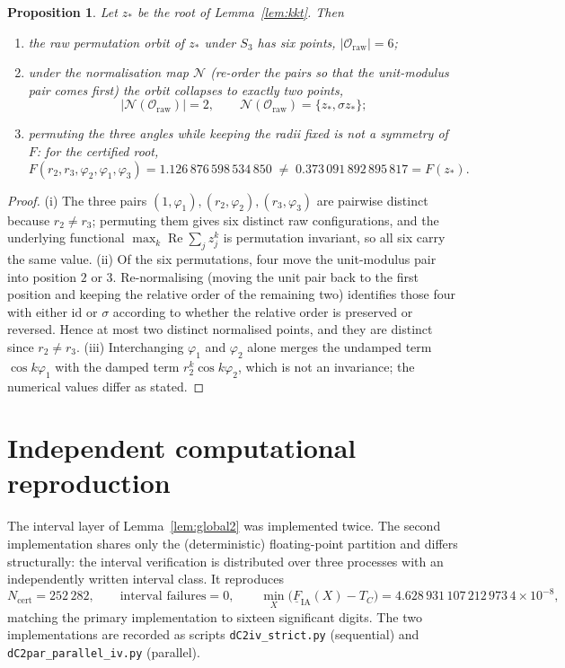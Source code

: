 \documentclass[11pt]{article}
\newtheorem{proposition}[theorem]{Proposition}
\theoremstyle{remark}
\begin{document}
\begin{proposition}\label{prop:orbit}
Let $z_*$ be the root of Lemma~\ref{lem:kkt}. Then
\begin{enumerate}
\item[(i)] the raw permutation orbit of $z_*$ under $S_3$ has six points,
$|\mathcal O_{\mathrm{raw}}|=6$;
\item[(ii)] under the normalisation map $\mathcal N$ (re-order the pairs so that the unit-modulus pair
comes first) the orbit collapses to exactly two points,
\[
\bigl|\mathcal N(\mathcal O_{\mathrm{raw}})\bigr|=2,\qquad
\mathcal N(\mathcal O_{\mathrm{raw}})=\{z_*,\sigma z_*\};
\]
\item[(iii)] permuting the three angles while keeping the radii fixed is \emph{not} a symmetry of $F$: for
the certified root,
\[
F(r_2,r_3,\varphi_2,\varphi_1,\varphi_3)=1.126\,876\,598\,534\,850
\;\ne\;0.373\,091\,892\,895\,817=F(z_*) .
\]
\end{enumerate}
\end{proposition}

\begin{proof}
(i) The three pairs $(1,\varphi_1),(r_2,\varphi_2),(r_3,\varphi_3)$ are pairwise distinct because
$r_2\ne r_3$; permuting them gives six distinct raw configurations, and the underlying functional
$\max_k\operatorname{Re}\sum_jz_j^k$ is permutation invariant, so all six carry the same value.
(ii) Of the six permutations, four move the unit-modulus pair into position $2$ or $3$. Re-normalising
(moving the unit pair back to the first position and keeping the relative order of the remaining two)
identifies those four with either $\mathrm{id}$ or $\sigma$ according to whether the relative order is
preserved or reversed. Hence at most two distinct normalised points, and they are distinct since
$r_2\ne r_3$.
(iii) Interchanging $\varphi_1$ and $\varphi_2$ alone merges the undamped term $\cos k\varphi_1$ with the
damped term $r_2^k\cos k\varphi_2$, which is not an invariance; the numerical values differ as stated.
\end{proof}

\section{Independent computational reproduction}

The interval layer of Lemma~\ref{lem:global2} was implemented twice. The second implementation shares only
the (deterministic) floating-point partition and differs structurally: the interval verification is
distributed over three processes with an independently written interval class. It reproduces
\[
N_{\mathrm{cert}}=252\,282,\qquad \text{interval failures}=0,\qquad
\min_X\bigl(\underline F_{\mathrm{IA}}(X)-T_C\bigr)=4.628\,931\,107\,212\,973\,4\times10^{-8},
\]
matching the primary implementation to sixteen significant digits. The two implementations are recorded as
scripts \texttt{dC2iv\_strict.py} (sequential) and \texttt{dC2par\_parallel\_iv.py} (parallel).
\end{document}
